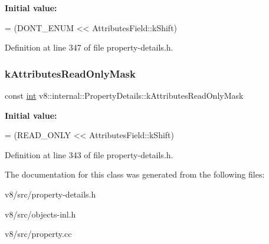 {\bfseries Initial value\+:}
\begin{DoxyCode}
=
      (DONT\_ENUM << AttributesField::kShift)
\end{DoxyCode}


Definition at line 347 of file property-\/details.\+h.

\mbox{\label{classv8_1_1internal_1_1PropertyDetails_a8125f4da997364ee7cdc4eb3c83d2342}} 
\subsubsection{\texorpdfstring{k\+Attributes\+Read\+Only\+Mask}{kAttributesReadOnlyMask}}
{\footnotesize\ttfamily const \mbox{\hyperlink{classint}{int}} v8\+::internal\+::\+Property\+Details\+::k\+Attributes\+Read\+Only\+Mask\hspace{0.3cm}{\ttfamily [static]}}

{\bfseries Initial value\+:}
\begin{DoxyCode}
=
      (READ\_ONLY << AttributesField::kShift)
\end{DoxyCode}


Definition at line 343 of file property-\/details.\+h.



The documentation for this class was generated from the following files\+:\begin{DoxyCompactItemize}
\item 
v8/src/property-\/details.\+h\item 
v8/src/objects-\/inl.\+h\item 
v8/src/property.\+cc\end{DoxyCompactItemize}
